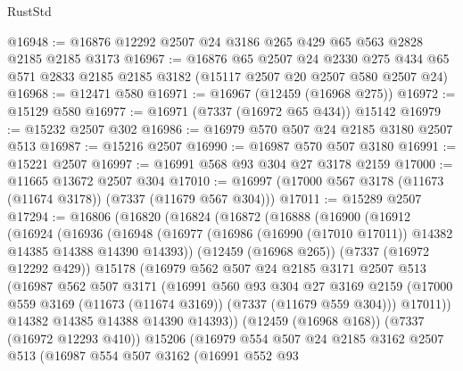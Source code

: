 \begin{lexlean}{RustStd}
\begin{coremodule}
@16948 := @16876 @12292 @2507 @24 @3186 @265 @429 @65 @563 @2828 @2185 @2185 @3173
@16967 := @16876
    @65
    @2507
    @24
    @2330
    @275
    @434
    @65
    @571
    @2833
    @2185
    @2185
    @3182
    (@15117 @2507 @20 @2507 @580 @2507 @24)
@16968 := @12471 @580
@16971 := @16967 (@12459 (@16968 @275))
@16972 := @15129 @580
@16977 := @16971 (@7337 (@16972 @65 @434)) @15142
@16979 := @15232 @2507 @302
@16986 := @16979 @570 @507 @24 @2185 @3180 @2507 @513
@16987 := @15216 @2507
@16990 := @16987 @570 @507 @3180
@16991 := @15221 @2507
@16997 := @16991 @568 @93 @304 @27 @3178 @2159
@17000 := @11665 @13672 @2507 @304
@17010 := @16997 (@17000 @567 @3178 (@11673 (@11674 @3178)) (@7337 (@11679 @567 @304)))
@17011 := @15289 @2507
@17294 := @16806
    (@16820
      (@16824
        (@16872
          (@16888
            (@16900
              (@16912
                (@16924
                  (@16936
                    (@16948
                      (@16977 (@16986 (@16990 (@17010 @17011)) @14382 @14385 @14388 @14390 @14393))
                      (@12459 (@16968 @265))
                      (@7337 (@16972 @12292 @429))
                      @15178
                      (@16979
                        @562
                        @507
                        @24
                        @2185
                        @3171
                        @2507
                        @513
                        (@16987
                          @562
                          @507
                          @3171
                          (@16991
                            @560
                            @93
                            @304
                            @27
                            @3169
                            @2159
                            (@17000 @559 @3169 (@11673 (@11674 @3169)) (@7337 (@11679 @559 @304)))
                            @17011))
                        @14382
                        @14385
                        @14388
                        @14390
                        @14393))
                    (@12459 (@16968 @168))
                    (@7337 (@16972 @12293 @410))
                    @15206
                    (@16979
                      @554
                      @507
                      @24
                      @2185
                      @3162
                      @2507
                      @513
                      (@16987
                        @554
                        @507
                        @3162
                        (@16991
                          @552
                          @93

\end{coremodule}
\end{lexlean}

